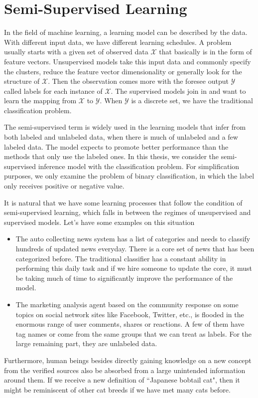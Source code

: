 \section{Semi-Supervised Learning}
In the field of machine learning, a learning model can be described by the data. With different input data, we have different learning schedules. A problem usually starts with a given set of observed data $\mathcal{X}$ that basically is in the form of feature vectors. Unsupervised models take this input data and commonly specify the clusters, reduce the feature vector dimensionality or generally look for the structure of $\mathcal{X}$. Then the observation comes more with the foresee output $\mathcal{Y}$ called labels for each instance of $\mathcal{X}$. The supervised models join in and want to learn the mapping from $\mathcal{X}$ to $\mathcal{Y}$. When $\mathcal{Y}$ is a discrete set, we have the traditional classification problem. 

The semi-supervised term is widely used in the learning models that infer from both labeled and unlabeled data, when there is much of unlabeled and a few labeled data. The model expects to promote better performance than the methods that only use the labeled ones. In this thesis, we consider the semi-supervised inference model with the classification problem. For simplification purposes, we only examine the problem of binary classification, in which the label only receives positive or negative value. 

It is natural that we have some learning processes that follow the condition of semi-supervised learning, which falls in between the regimes of unsupervised and supervised models. Let's have some examples on this situation
\begin{itemize}  
	\item The auto collecting news system has a list of categories and needs to classify hundreds of updated news everyday. There is a core set of news that has been categorized before. The traditional classifier has a constant ability in performing this daily task and if we hire someone to update the core, it must be taking much of time to significantly improve the performance of the model.
	
 	\item The marketing analysis agent based on the community response on some topics on social network sites like Facebook, Twitter, etc., is flooded in the enormous range of user comments, shares or reactions. A few of them have tag names or come from the same groups that we can treat as labels. For the large remaining part, they are unlabeled data.
\end{itemize}
Furthermore, human beings besides directly gaining knowledge on a new concept from the verified sources also be absorbed from a large unintended information around them. If we receive a new definition of ``Japanese bobtail cat", then it might be reminiscent of other cat breeds if we have met many cats before.

